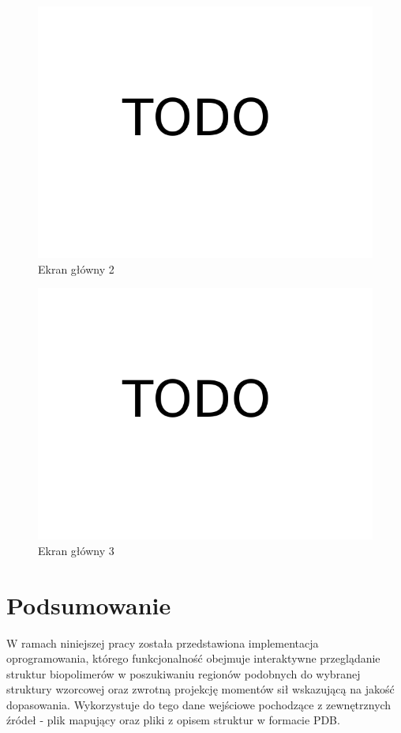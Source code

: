 \documentclass[licencjacka]{pracamgr}
\begin{document}
\begin{figure}[H]
\centering
\includegraphics[scale=0.3,center]{todo}
\caption{Ekran główny 2}
\end{figure}

\begin{figure}[H]
\centering
\includegraphics[scale=0.3,center]{todo}
\caption{Ekran główny 3}
\end{figure}

\chapter{Podsumowanie}
W ramach niniejszej pracy została przedstawiona implementacja oprogramowania, którego funkcjonalność obejmuje interaktywne przeglądanie struktur biopolimerów w poszukiwaniu regionów podobnych do wybranej struktury wzorcowej oraz zwrotną projekcję momentów sił wskazującą na jakość dopasowania. Wykorzystuje do tego dane wejściowe pochodzące z zewnętrznych źródeł - plik mapujący oraz pliki z opisem struktur w formacie PDB.
\end{document}
